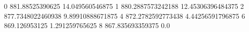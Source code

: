 0 881.88525390625 14.049560546875
1 880.2887573242188 12.45306396484375
2 877.7348022460938 9.89910888671875
4 872.2782592773438 4.44256591796875
6 869.126953125 1.291259765625
8 867.835693359375 0.0

